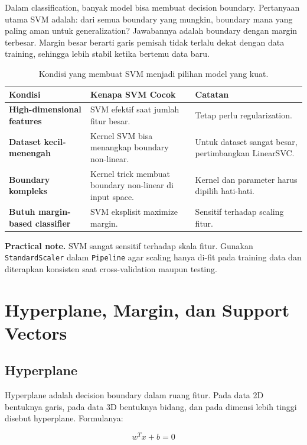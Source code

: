 \documentclass{article}
\newcommand{\code}[1]{\texttt{#1}}
\newcommand{\infobox}[2]{%
  \par\vspace{0.6em}
  \noindent\colorbox{#1}{%
    \begin{minipage}{0.96\textwidth}
    \vspace{0.65em}
    #2
    \vspace{0.65em}
    \end{minipage}}
  \par\vspace{0.8em}
}
\begin{document}
Dalam classification, banyak model bisa membuat decision boundary. Pertanyaan utama SVM adalah: dari semua boundary yang mungkin, boundary mana yang paling aman untuk generalization? Jawabannya adalah boundary dengan margin terbesar. Margin besar berarti garis pemisah tidak terlalu dekat dengan data training, sehingga lebih stabil ketika bertemu data baru.

\begin{table}[H]
\centering
{}
\begin{tabularx}{\textwidth}{>{\bfseries}lXX}
\rowcolor{tableHead}
Kondisi & Kenapa SVM Cocok & Catatan \\
\toprule
High-dimensional features & SVM efektif saat jumlah fitur besar. & Tetap perlu regularization. \\
Dataset kecil-menengah & Kernel SVM bisa menangkap boundary non-linear. & Untuk dataset sangat besar, pertimbangkan LinearSVC. \\
Boundary kompleks & Kernel trick membuat boundary non-linear di input space. & Kernel dan parameter harus dipilih hati-hati. \\
Butuh margin-based classifier & SVM eksplisit maximize margin. & Sensitif terhadap scaling fitur. \\
\bottomrule
\end{tabularx}
\caption{Kondisi yang membuat SVM menjadi pilihan model yang kuat.}
\end{table}

\infobox{softOrange}{\textbf{Practical note.} SVM sangat sensitif terhadap skala fitur. Gunakan \code{StandardScaler} dalam \code{Pipeline} agar scaling hanya di-fit pada training data dan diterapkan konsisten saat cross-validation maupun testing.}

\section{Hyperplane, Margin, dan Support Vectors}

\subsection{Hyperplane}

Hyperplane adalah decision boundary dalam ruang fitur. Pada data 2D bentuknya garis, pada data 3D bentuknya bidang, dan pada dimensi lebih tinggi disebut hyperplane. Formulanya:

\begin{equation}
w^T x + b = 0
\end{equation}
\end{document}
